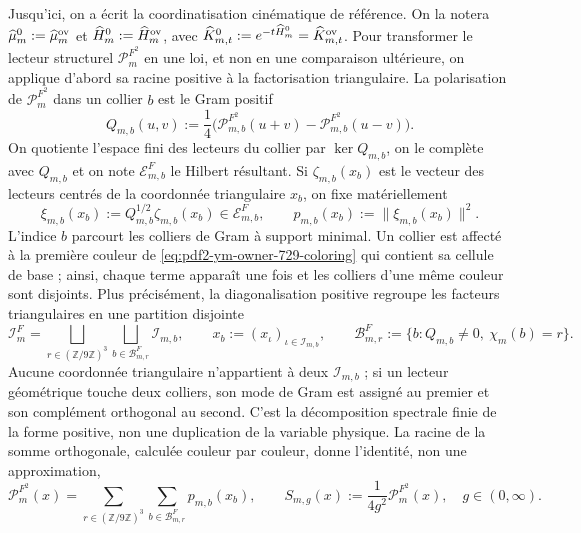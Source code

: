 Jusqu'ici, on a écrit la coordinatisation cinématique de référence. On la notera $\widehat\mu_m^0:=\widehat\mu_m^{\rm ov}$ et $\widehat H_m^0:=\widehat H_m^{\rm ov}$, avec $\widehat K_{m,t}^0:=e^{-t\widehat H_m^0}=\widehat K_{m,t}^{\rm ov}$. Pour transformer le lecteur structurel $\mathcal P_m^{F^2}$ en une loi, et non en une comparaison ultérieure, on applique d'abord sa racine positive à la factorisation triangulaire. La polarisation de $\mathcal P_m^{F^2}$ dans un collier $b$ est le Gram positif
\[
 Q_{m,b}(u,v):=\frac14\bigl(
 \mathcal P_{m,b}^{F^2}(u+v)-\mathcal P_{m,b}^{F^2}(u-v)
 \bigr).
\]
On quotiente l’espace fini des lecteurs du collier par $\ker Q_{m,b}$, on le complète
avec $Q_{m,b}$ et on note $\mathcal E_{m,b}^{F}$ le Hilbert résultant. Si
$\zeta_{m,b}(x_b)$ est le vecteur des lecteurs centrés de la coordonnée triangulaire
$x_b$, on fixe matériellement
\begin{equation}\label{eq:pdf2-ym-action-root}
 \xi_{m,b}(x_b):=Q_{m,b}^{1/2}\zeta_{m,b}(x_b)
 \in\mathcal E_{m,b}^{F},
 \qquad
 p_{m,b}(x_b):=\|\xi_{m,b}(x_b)\|^2.
\end{equation}
L'indice $b$ parcourt les colliers de Gram à support minimal. Un collier est affecté à la première couleur de \eqref{eq:pdf2-ym-owner-729-coloring} qui contient sa cellule de base ; ainsi, chaque terme apparaît une fois et les colliers d'une même couleur sont disjoints. Plus précisément, la diagonalisation positive regroupe les facteurs triangulaires en une partition disjointe
\begin{equation}\label{eq:pdf2-ym-action-factor-partition}
 \mathcal I_m^{F}
 =\bigsqcup_{r\in(\mathbb Z/9\mathbb Z)^3}
   \bigsqcup_{b\in\mathcal B_{m,r}^{F}}\mathcal I_{m,b},
 \qquad x_b:=(x_\iota)_{\iota\in\mathcal I_{m,b}},
 \qquad
 \mathcal B_{m,r}^{F}:=\{b:Q_{m,b}\ne0,\ \chi_m(b)=r\}.
\end{equation}
Aucune coordonnée triangulaire n’appartient à deux $\mathcal I_{m,b}$ ; si un lecteur
géométrique touche deux colliers, son mode de Gram est assigné au premier et son complément
orthogonal au second. C’est la décomposition spectrale finie de la forme positive,
non une duplication de la variable physique.
La racine de la somme orthogonale, calculée couleur par couleur, donne l’identité, non une
approximation,
\begin{equation}\label{eq:pdf2-ym-action-reader-sum}
 \mathcal P_m^{F^2}(x)
 =\sum_{r\in(\mathbb Z/9\mathbb Z)^3}
   \sum_{b\in\mathcal B_{m,r}^{F}}p_{m,b}(x_b),
 \qquad
 S_{m,g}(x):=\frac1{4g^2}\mathcal P_m^{F^2}(x),
 \quad g\in(0,\infty).
\end{equation}
